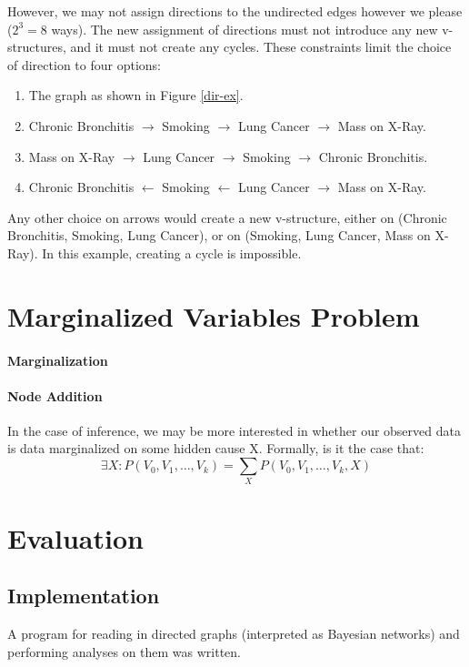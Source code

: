 \documentclass{article}
\newcommand{\problemtwo}{Marginalized Variables Problem}
\begin{document}
	However, we may not assign directions to the undirected edges however we please ($2^3=8$ ways).
	The new assignment of directions must not introduce any new v-structures, and it must not create any cycles.
	These constraints limit the choice of direction to four options:
	\begin{enumerate}
		\item The graph as shown in Figure \ref{dir-ex}.
		\item Chronic Bronchitis $\rightarrow$ Smoking $\rightarrow$ Lung Cancer $\rightarrow$ Mass on X-Ray.
		\item Mass on X-Ray $\rightarrow$ Lung Cancer $\rightarrow$ Smoking $\rightarrow$ Chronic Bronchitis.
		\item Chronic Bronchitis $\leftarrow$ Smoking $\leftarrow$ Lung Cancer $\rightarrow$ Mass on X-Ray.
	\end{enumerate}
	Any other choice on arrows would create a new v-structure, either on (Chronic Bronchitis, Smoking, Lung Cancer), or on (Smoking, Lung Cancer, Mass on X-Ray). In this example, creating a cycle is impossible.
	
	\section{\problemtwo}
	\paragraph{Marginalization}
	
	\paragraph{Node Addition}
	In the case of inference, we may be more interested in whether our observed data is data marginalized on some hidden cause X.
	Formally, is it the case that:
	$$
	\exists X: P(V_0, V_1, \dots, V_k) = \sum_X{P(V_0, V_1, \dots, V_k, X)}
	$$
	
	\section{Evaluation}
	
	\subsection{Implementation}
	
	A program for reading in directed graphs (interpreted as Bayesian networks) and performing analyses on them was written.
	
\end{document}
